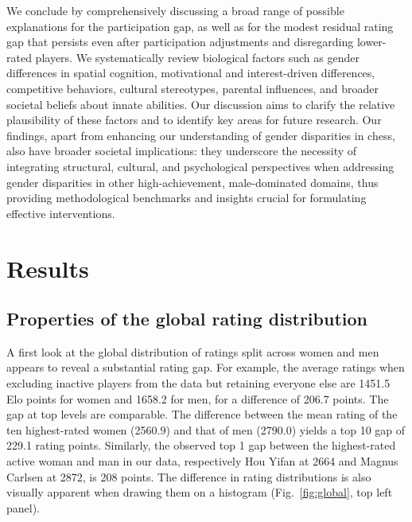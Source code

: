 \documentclass[9pt,twocolumn,twoside,lineno]{pnas-new}
\begin{document}
We conclude by comprehensively discussing a broad range of possible explanations for the participation gap, as well as for the modest residual rating gap that persists even after participation adjustments and disregarding lower-rated players. We systematically review biological factors such as gender differences in spatial cognition, motivational and interest-driven differences, competitive behaviors, cultural stereotypes, parental influences, and broader societal beliefs about innate abilities. Our discussion aims to clarify the relative plausibility of these factors and to identify key areas for future research. Our findings, apart from enhancing our understanding of gender disparities in chess, also have broader societal implications: they underscore the necessity of integrating structural, cultural, and psychological perspectives when addressing gender disparities in other high-achievement, male-dominated domains, thus providing methodological benchmarks and insights crucial for formulating effective interventions.



\section*{Results}

\subsection*{Properties of the global rating distribution}

A first look at the global distribution of ratings split across women and men appears to reveal a substantial rating gap. For example, the average ratings when excluding inactive players from the data but retaining everyone else are 1451.5 Elo points for women and 1658.2 for men, for a difference of 206.7 points. The gap at top levels are comparable. The difference between the mean rating of the ten highest-rated women (2560.9) and that of men (2790.0) yields a top 10 gap of 229.1 rating points. Similarly, the observed top 1 gap between the highest-rated active woman and man in our data, respectively Hou Yifan at 2664 and Magnus Carlsen at 2872, is 208 points. The difference in rating distributions is also visually apparent when drawing them on a histogram (Fig.~\ref{fig:global}, top left panel).
\end{document}
